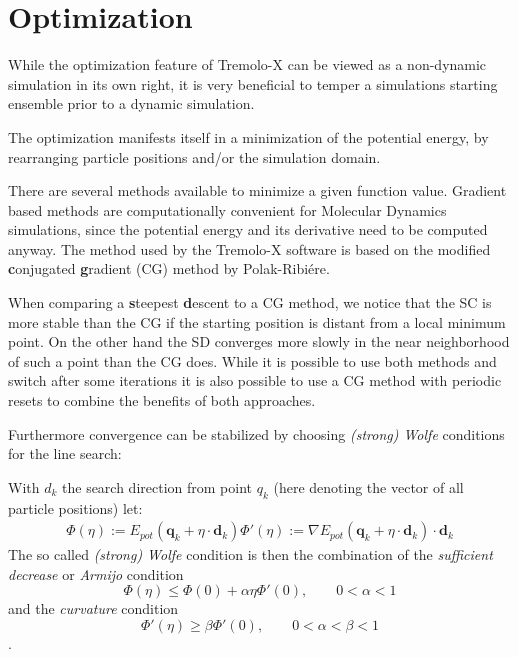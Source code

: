 
\chapter{Optimization}
\label{optimization}

While the optimization feature of Tremolo-X can be viewed as a non-dynamic
simulation in its own right, it is very beneficial to temper a simulations starting
ensemble prior to a dynamic simulation.

The optimization manifests itself in a minimization of the potential energy,
by rearranging particle positions and/or the simulation domain.

There are several methods available to minimize a given function value. Gradient based methods are computationally convenient for Molecular Dynamics simulations, since the
potential energy and its derivative need to be computed anyway. The method used by the Tremolo-X software is based on the modified \textbf{c}onjugated \textbf{g}radient (CG)
method by Polak-Ribi\'ere.\cite{Griebel.Hamaekers:2005b}

When comparing a \textbf{s}teepest \textbf{d}escent to a CG method, we notice that the SC is more stable than the CG if the starting position is distant from a local minimum point.
On the other hand the SD converges more slowly in the near neighborhood of such a point than the CG does. While it is possible to use both methods and switch after some iterations it is also possible to use a CG method with periodic resets to combine the benefits of both approaches.

Furthermore convergence can be stabilized by choosing \emph{(strong) Wolfe} conditions for the line search:

With $d_k$ the search direction from point $q_k$ (here denoting the vector of all particle positions) let:
\begin{align*}
\Phi(\eta) := E_{pot} \left( \textbf{q}_k + \eta \cdot \textbf{d}_k \right)
\Phi'(\eta) := \nabla E_{pot} \left( \textbf{q}_k + \eta \cdot \textbf{d}_k \right) \cdot \textbf{d}_k
\end{align*}
The so called \emph{(strong) Wolfe} condition is then the combination of the \emph{sufficient decrease} or \emph{Armijo} condition
\begin{equation*}
\Phi(\eta)\leq \Phi(0) + \alpha \eta \Phi'(0), \qquad 0 < \alpha < 1
\end{equation*}
and the \emph{curvature} condition
\begin{equation*}
\Phi'(\eta) \geq \beta \Phi'(0), \qquad 0 < \alpha < \beta < 1
\end{equation*}.

